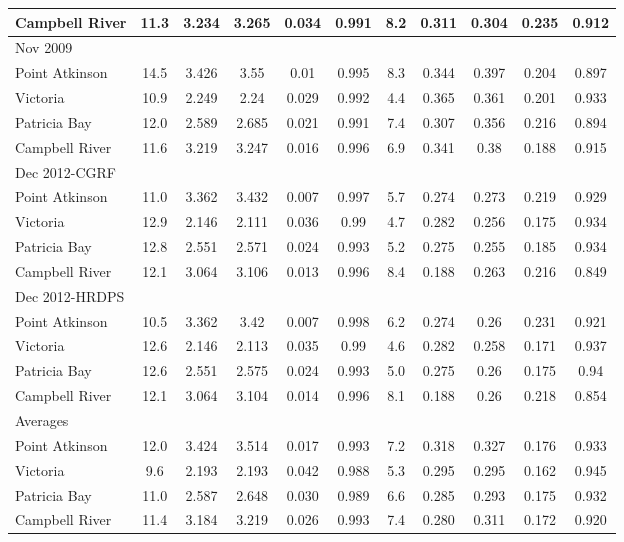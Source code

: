 \documentclass[letterpaper]{tATO2e}
\begin{document}
\begin{table}[h]
{\begin{tabular}{|l |c c c c c | c c c c c|}
Campbell River & 11.3& 3.234& 3.265& 0.034& 0.991& 8.2& 0.311& 0.304& 0.235& 0.912\\
\hline
Nov 2009& & & & & & & & & & \\
Point Atkinson & 14.5& 3.426& 3.55& 0.01& 0.995& 8.3& 0.344& 0.397& 0.204& 0.897\\
Victoria       & 10.9& 2.249& 2.24& 0.029& 0.992& 4.4& 0.365& 0.361& 0.201& 0.933\\
Patricia Bay   & 12.0& 2.589& 2.685& 0.021& 0.991& 7.4& 0.307& 0.356& 0.216& 0.894\\
Campbell River & 11.6& 3.219& 3.247& 0.016& 0.996& 6.9& 0.341& 0.38& 0.188& 0.915\\
\hline
Dec 2012-CGRF& & & & & & & & & & \\
Point Atkinson & 11.0& 3.362& 3.432& 0.007& 0.997& 5.7& 0.274& 0.273& 0.219& 0.929\\
Victoria       & 12.9& 2.146& 2.111& 0.036& 0.99& 4.7& 0.282& 0.256& 0.175& 0.934\\
Patricia Bay   & 12.8& 2.551& 2.571& 0.024& 0.993& 5.2& 0.275& 0.255& 0.185& 0.934\\
Campbell River & 12.1& 3.064& 3.106& 0.013& 0.996& 8.4& 0.188& 0.263& 0.216& 0.849\\
\hline
Dec 2012-HRDPS& & &  &  &  &  &  &  &  &  \\
Point Atkinson &  10.5&  3.362&  3.42&  0.007&  0.998&  6.2&  0.274&  0.26&  0.231&  0.921\\
Victoria       &  12.6&  2.146&  2.113&  0.035&  0.99&  4.6&  0.282&  0.258&  0.171&  0.937\\
Patricia Bay   &  12.6& 2.551& 2.575& 0.024& 0.993& 5.0& 0.275& 0.26& 0.175& 0.94\\
Campbell River & 12.1& 3.064& 3.104& 0.014& 0.996& 8.1& 0.188& 0.26& 0.218& 0.854\\
\hline
\hline
Averages& & & & & & & & & & \\
Point Atkinson & 12.0 & 3.424 & 3.514 & 0.017 & 0.993 & 7.2 & 0.318 & 0.327 & 0.176 & 0.933\\
Victoria       & 9.6 & 2.193 & 2.193 & 0.042 & 0.988 & 5.3 & 0.295 & 0.295 & 0.162 & 0.945\\
Patricia Bay   & 11.0 & 2.587 & 2.648 & 0.030 & 0.989 & 6.6 & 0.285 & 0.293 & 0.175 & 0.932\\
Campbell River & 11.4 & 3.184 & 3.219 & 0.026 & 0.993 & 7.4 & 0.280 & 0.311 & 0.172 & 0.920\\
\hline
\end{tabular}}
\label{tab:statistics}
\end{table} 
\end{document}
